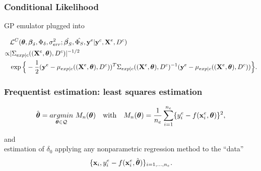 \documentclass[nopagenumber,9pt]{beamer}
\begin{document}
\begin{frame}
 \frametitle{Conditional Likelihood}
 GP emulator plugged into 
 
 \begin{equation*}
\begin{split}
&\mathcal{L}^C(\boldsymbol{\theta},\boldsymbol{\beta}_{\delta},\Phi_{\delta},\sigma^2_{err};\hat{\boldsymbol{\beta}_S},\hat{\Phi_S},\mathbf{y}^{e}|\mathbf{y}^c,\mathbf{X}^e,D^c)\\ \propto &|\Sigma_{exp|c}((\mathbf{X}^e,\boldsymbol{\theta}),D^c)|^{-1/2}\\ &\exp\Big\{-\frac{1}{2}(\mathbf{y}^{e}-\mu_{exp|c}((\mathbf{X}^e,\boldsymbol{\theta}),D^c))^T \Sigma_{exp|c}((\mathbf{X}^e,\boldsymbol{\theta}),D^c)^{-1} (\mathbf{y}^{e}-\mu_{exp|c}((\mathbf{X}^e,\boldsymbol{\theta}),D^c))\Big\}.
\label{eq:conditionalLikelihood}
\end{split}
\end{equation*}
 
\end{frame}


\begin{frame}
 \frametitle{Frequentist estimation: least squares estimation}
 \cite{cox2001,wong2017}
 \begin{equation}
\hat{\boldsymbol{\theta}}= \underset{\boldsymbol{\theta}\in\mathcal{Q}}{argmin} \ M_n(\boldsymbol{\theta}) \quad \text{with} \quad M_n(\boldsymbol{\theta})=\frac{1}{n_e}\sum_{i=1}^{n_e} \{y^{e}_i-f(\mathbf{x}^e_i,\boldsymbol{\theta})\}^2,
\end{equation}

and \\
estimation of $\delta_0$  applying any nonparametric regression method to the “data”
$$\{\mathbf{x}_i, y^{e}_i - f(\mathbf{x}^e_i,\hat{\boldsymbol{\theta}})\}_{i=1,\ldots,n_e}.$$


\end{frame}
\end{document}
